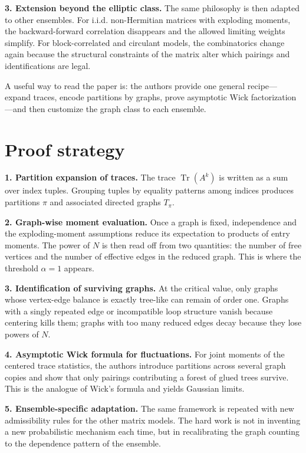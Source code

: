 \documentclass[11pt]{article}
\begin{document}
\textbf{3. Extension beyond the elliptic class.} The same philosophy is then adapted to other ensembles. For i.i.d. non-Hermitian matrices with exploding moments, the backward-forward correlation disappears and the allowed limiting weights simplify. For block-correlated and circulant models, the combinatorics change again because the structural constraints of the matrix alter which pairings and identifications are legal.

A useful way to read the paper is: the authors provide one general recipe---expand traces, encode partitions by graphs, prove asymptotic Wick factorization---and then customize the graph class to each ensemble.

\section*{Proof strategy}
\textbf{1. Partition expansion of traces.} The trace $\operatorname{Tr}(A^k)$ is written as a sum over index tuples. Grouping tuples by equality patterns among indices produces partitions $\pi$ and associated directed graphs $T_\pi$.

\textbf{2. Graph-wise moment evaluation.} Once a graph is fixed, independence and the exploding-moment assumptions reduce its expectation to products of entry moments. The power of $N$ is then read off from two quantities: the number of free vertices and the number of effective edges in the reduced graph. This is where the threshold $\alpha=1$ appears.

\textbf{3. Identification of surviving graphs.} At the critical value, only graphs whose vertex-edge balance is exactly tree-like can remain of order one. Graphs with a singly repeated edge or incompatible loop structure vanish because centering kills them; graphs with too many reduced edges decay because they lose powers of $N$.

\textbf{4. Asymptotic Wick formula for fluctuations.} For joint moments of the centered trace statistics, the authors introduce partitions across several graph copies and show that only pairings contributing a forest of glued trees survive. This is the analogue of Wick's formula and yields Gaussian limits.

\textbf{5. Ensemble-specific adaptation.} The same framework is repeated with new admissibility rules for the other matrix models. The hard work is not in inventing a new probabilistic mechanism each time, but in recalibrating the graph counting to the dependence pattern of the ensemble.
\end{document}
